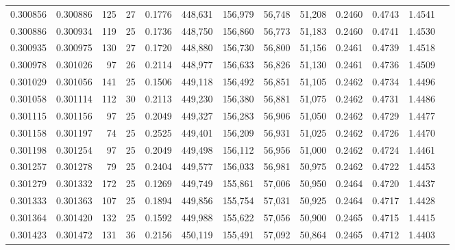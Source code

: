 \begin{tabular}{rrrrrrrrrrrrr}
0.300856 & 0.300886 &   125 &  27 &                                     0.1776 & 448,631 & 156,979 &  56,748 &  51,208 & 0.2460 & 0.4743 & 1.4541 \\
0.300886 & 0.300934 &   119 &  25 &                                     0.1736 & 448,750 & 156,860 &  56,773 &  51,183 & 0.2460 & 0.4741 & 1.4530 \\
0.300935 & 0.300975 &   130 &  27 &                                     0.1720 & 448,880 & 156,730 &  56,800 &  51,156 & 0.2461 & 0.4739 & 1.4518 \\
0.300978 & 0.301026 &    97 &  26 &                                     0.2114 & 448,977 & 156,633 &  56,826 &  51,130 & 0.2461 & 0.4736 & 1.4509 \\
0.301029 & 0.301056 &   141 &  25 &                                     0.1506 & 449,118 & 156,492 &  56,851 &  51,105 & 0.2462 & 0.4734 & 1.4496 \\
0.301058 & 0.301114 &   112 &  30 &                                     0.2113 & 449,230 & 156,380 &  56,881 &  51,075 & 0.2462 & 0.4731 & 1.4486 \\
0.301115 & 0.301156 &    97 &  25 &                                     0.2049 & 449,327 & 156,283 &  56,906 &  51,050 & 0.2462 & 0.4729 & 1.4477 \\
0.301158 & 0.301197 &    74 &  25 &                                     0.2525 & 449,401 & 156,209 &  56,931 &  51,025 & 0.2462 & 0.4726 & 1.4470 \\
0.301198 & 0.301254 &    97 &  25 &                                     0.2049 & 449,498 & 156,112 &  56,956 &  51,000 & 0.2462 & 0.4724 & 1.4461 \\
0.301257 & 0.301278 &    79 &  25 &                                     0.2404 & 449,577 & 156,033 &  56,981 &  50,975 & 0.2462 & 0.4722 & 1.4453 \\
0.301279 & 0.301332 &   172 &  25 &                                     0.1269 & 449,749 & 155,861 &  57,006 &  50,950 & 0.2464 & 0.4720 & 1.4437 \\
0.301333 & 0.301363 &   107 &  25 &                                     0.1894 & 449,856 & 155,754 &  57,031 &  50,925 & 0.2464 & 0.4717 & 1.4428 \\
0.301364 & 0.301420 &   132 &  25 &                                     0.1592 & 449,988 & 155,622 &  57,056 &  50,900 & 0.2465 & 0.4715 & 1.4415 \\
0.301423 & 0.301472 &   131 &  36 &                                     0.2156 & 450,119 & 155,491 &  57,092 &  50,864 & 0.2465 & 0.4712 & 1.4403 \\

\end{tabular}
